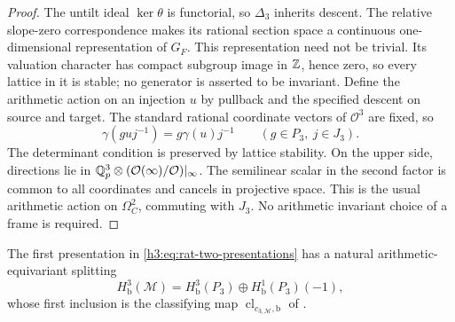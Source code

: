 \begin{proof}
The untilt ideal $\ker\theta$ is functorial, so $\Delta_3$
inherits descent.  The relative slope-zero correspondence
makes its rational section space a continuous one-dimensional
representation of $G_F$.  This representation need not be
trivial.  Its valuation character has compact subgroup image
in $\mathbb Z$, hence zero, so every lattice in it is stable;
no generator is asserted to be invariant.
Define the arithmetic action on an injection $u$ by pullback
and the specified descent on source and target.  The standard
rational coordinate vectors of $\mathcal O^3$ are fixed, so
\[
 \gamma(guj^{-1})=g\gamma(u)j^{-1}
       \qquad(g\in P_3,\ j\in J_3).
\]
The determinant condition is preserved by lattice stability.
On the upper side, directions lie in
$\mathbb Q_p^3\otimes(\mathcal O(\infty)/\mathcal O)|_\infty$.
The semilinear scalar in the second factor is common to all
coordinates and cancels in projective space.  This is the usual
arithmetic action on $\Omega_C^2$, commuting with $J_3$.
No arithmetic invariant choice of a frame is required.
\end{proof}

\begin{lemma}\label{h3:rat:fixed-projective}
The first presentation in \eqref{h3:eq:rat-two-presentations} has
a natural arithmetic-equivariant splitting
\begin{equation}\label{h3:eq:rat-projective-h3}
 H^3_{\mathrm b}(\mathcal M)
   =H^3_{\mathrm b}(P_3)\oplus H^1_{\mathrm b}(P_3)(-1),
\end{equation}
whose first inclusion is the classifying map
$\operatorname{cl}_{c_{3,\mathcal M},\mathrm b}$ of
.
\end{lemma}

